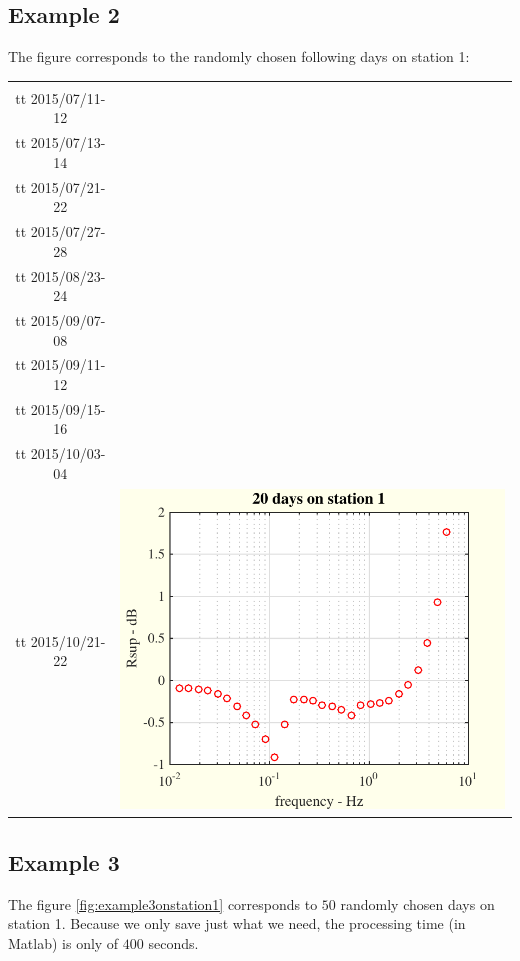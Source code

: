 \documentclass[a4paper, 12pt]{report}
\begin{document}
\subsection{Example 2}
The figure corresponds to the randomly chosen following days on station 1:
\begin{tabular}{cc}
 \begin{minipage}{0.35\textwidth}
 days:\\
 {tt 2015/07/11-12 }\\
{tt 2015/07/13-14 }\\
{tt 2015/07/21-22 }\\
{tt 2015/07/27-28 }\\
{tt 2015/08/23-24 }\\
{tt 2015/09/07-08 }\\
{tt 2015/09/11-12 }\\
{tt 2015/09/15-16 }\\
{tt 2015/10/03-04 }\\
{tt 2015/10/21-22 }
\end{minipage}
&
 \begin{minipage}{0.35\textwidth}
\includegraphics[scale=0.8]{example2onstation1.pdf}
\end{minipage}
\end{tabular}

\subsection{Example 3}
 The figure \ref{fig:example3onstation1} corresponds to $50$ randomly chosen days on station 1.  Because we  only save just what we need, the processing time (in Matlab) is only of $400$ seconds.
\end{document}
